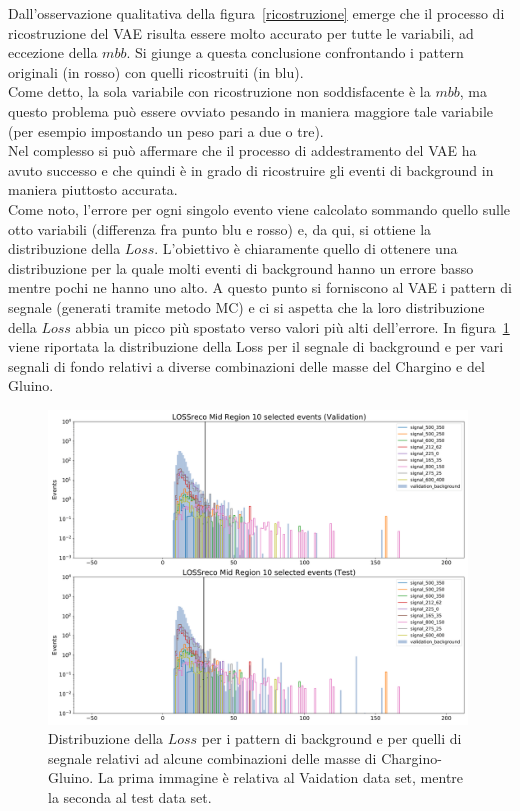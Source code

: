 Dall'osservazione qualitativa della figura~\ref{ricostruzione} emerge che il processo di ricostruzione del VAE risulta essere molto accurato per tutte le variabili, ad eccezione della $\textit{mbb}$. Si giunge a questa conclusione confrontando i pattern originali (in rosso) con quelli ricostruiti (in blu). \\
Come detto, la sola variabile con ricostruzione non soddisfacente è la $\textit{mbb}$, ma questo problema può essere ovviato pesando in maniera maggiore tale variabile (per esempio impostando un peso pari a due o tre).\\
Nel complesso si può affermare che il processo di addestramento del VAE ha avuto successo e che quindi è in grado di ricostruire gli eventi di background in maniera piuttosto accurata. \\ 
Come noto, l'errore per ogni singolo evento viene calcolato sommando quello sulle otto variabili (differenza fra punto blu e rosso) e, da qui, si ottiene la distribuzione della $\textit{Loss}$. L'obiettivo è chiaramente quello di ottenere una distribuzione per la quale molti eventi di background hanno un errore basso mentre pochi ne hanno uno alto. A questo punto si forniscono al VAE i pattern di segnale (generati tramite metodo MC) e ci si aspetta che la loro distribuzione della $\textit{Loss}$ abbia un picco più spostato verso valori più alti dell'errore. In figura~\ref{distribuzione_loss} viene riportata la distribuzione della Loss per il segnale di background e per vari segnali di fondo relativi a diverse combinazioni delle masse del Chargino e del Gluino.

\begin{figure}[h!]
	\centering
	\includegraphics[width=0.99\textwidth]{figs/risultati_simulazione/distribuzioneLoss.png}
	\caption{Distribuzione della $\textit{Loss}$ per i pattern di background e per quelli di segnale relativi ad alcune combinazioni delle masse di Chargino-Gluino. La prima immagine è relativa al Vaidation data set, mentre la seconda al test data set.}
	\label{distribuzione_loss}
\end{figure}

